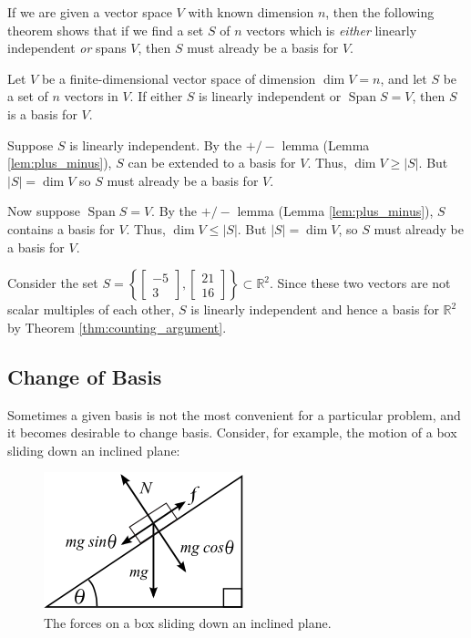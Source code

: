 \documentclass[12pt,letterpaper,reqno]{article}
\numberwithin{equation}{section}
\DeclareMathOperator{\Span}{Span}
\begin{document}
If we are given a vector space $V$ with known dimension $n$, then the following theorem shows that if we find a set $S$ of $n$ vectors which is \emph{either} linearly independent \emph{or} spans $V$, then $S$ must already be a basis for $V$.

\begin{thm}\label{thm:counting_argument}
	Let $V$ be a finite-dimensional vector space of dimension $\dim V=n$, and let $S$ be a set of $n$ vectors in $V$. If either $S$ is linearly independent or $\Span S=V$, then $S$ is a basis for $V$.
\end{thm}

\begin{pf}
Suppose $S$ is linearly independent. By the $+/-$ lemma (Lemma \ref{lem:plus_minus}), $S$ can be extended to a basis for $V$. Thus, $\dim V \geq |S|$. But $|S|=\dim V$ so $S$ must already be a basis for $V$.

Now suppose $\Span S=V$. By the $+/-$ lemma (Lemma \ref{lem:plus_minus}), $S$ contains a basis for $V$. Thus, $\dim V \leq |S|$. But $|S|=\dim V$, so $S$ must already be a basis for $V$.	
\end{pf}

\begin{example}
Consider the set $S=\left\{\begin{bmatrix}
	-5 \\ 3
\end{bmatrix}, \begin{bmatrix}
	21 \\ 16
\end{bmatrix}\right\} \subset \mathbb{R}^2$. Since these two vectors are not scalar multiples of each other, $S$ is linearly independent and hence a basis for $\mathbb{R}^2$ by Theorem \ref{thm:counting_argument}.
\end{example}

\subsection{Change of Basis}
Sometimes a given basis is not the most convenient for a particular problem, and it becomes desirable to change basis. Consider, for example, the motion of a box sliding down an inclined plane:
\begin{figure}[h]
	\begin{center}
		\includegraphics[scale=0.5]{figures_mvc/inclined_plane}
	\end{center}
	\caption{The forces on a box sliding down an inclined plane.}
\end{figure}
\end{document}
